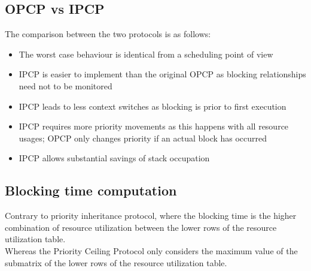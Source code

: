 \subsection{OPCP vs IPCP}
The comparison between the two protocols is as follows:
\begin{itemize}
    \item The worst case behaviour is identical from a scheduling point of view
    \item IPCP is easier to implement than the original OPCP as blocking relationships need not to be monitored
    \item IPCP leads to less context switches as blocking is prior to first execution
    \item IPCP requires more priority movements as this happens with all resource usages; OPCP only changes priority if an actual block has occurred
    \item IPCP allows substantial savings of stack occupation
\end{itemize}

\subsection{Blocking time computation}
Contrary to priority inheritance protocol, where the blocking time is the higher combination of resource utilization between the lower rows of the resource utilization table.\\
Whereas the Priority Ceiling Protocol only considers the maximum value of the submatrix of the lower rows of the resource utilization table.

